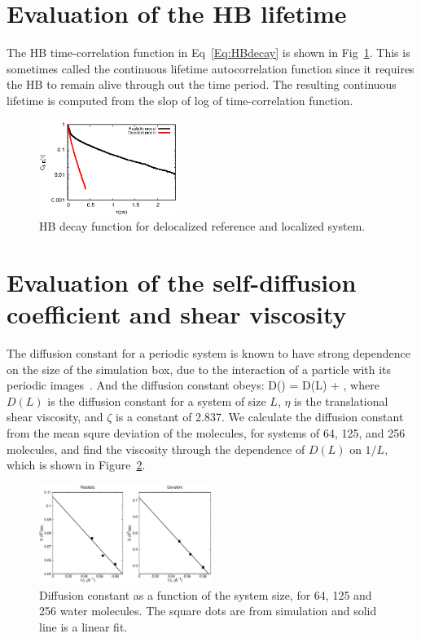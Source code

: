 \documentclass[aps,prl,reprint,amsmath,amssymb]{revtex4-1}
\begin{document}
\section{Evaluation of the HB lifetime} 
The HB time-correlation function in Eq~\ref{Eq:HBdecay} is shown in Fig~\ref{Fig:HBdecay}. 
This is sometimes called the continuous lifetime autocorrelation function since it requires the HB to remain alive through out the time period.
The resulting continuous lifetime is computed from the slop of log of time-correlation function.

\begin{figure}
\includegraphics[width=0.4\textwidth]{new_hbdecay}
\caption{HB decay function for delocalized reference and localized system.} \label{Fig:HBdecay}
\end{figure}

\section{Evaluation of the self-diffusion coefficient and shear viscosity} 

The diffusion constant for a periodic system is known to have strong dependence on the size of the simulation box, due to the interaction of a particle with its periodic images~\cite{dunweg1993molecular}. 
And the diffusion constant obeys:
%
\bea
D(\infty) = D(L) + ,
\eea
%
where $D(L)$ is the diffusion constant for a system of size $L$, $\eta$ is the translational shear viscosity, and $\zeta$ is a constant of 2.837. 
We calculate the diffusion constant from the mean squre deviation of the molecules, for systems of 64, 125, and 256 molecules, and find the viscosity through the dependence of $D(L)$ on $1/L$, which is shown in Figure~\ref{Fig:dfs}.

\begin{figure}
\includegraphics[width=0.5\textwidth]{msd}
\caption{Diffusion constant as a function of the system size, for 64, 125 and 256 water molecules. 
The square dots are from simulation and solid line is a linear fit.}\label{Fig:dfs}
\end{figure} 
\end{document}

